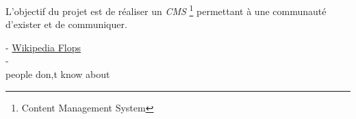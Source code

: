 \documentclass[12pt,a4paper,titlepage]{article}%
\begin{document}
L'objectif du projet est de réaliser un \emph{CMS} \footnote{Content Management System} permettant à une communauté d'exister et de communiquer.



-  \href{https://en.wikipedia.org/wiki/FLOPS}{Wikipedia Flops} \\
- \href{http://getbootstrap.com/} \\


people don‚t know about







\label{lastpage}
\end{document}
